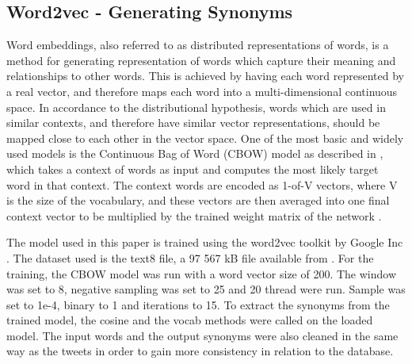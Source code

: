





\subsection{Word2vec - Generating Synonyms}
Word embeddings, also referred to as distributed representations of words, is a method for generating representation of words which capture their meaning and relationships to other words. This is achieved by having each word represented by a real vector, and therefore maps each word into a multi-dimensional continuous space. In accordance to the distributional hypothesis, words which are used in similar contexts, and therefore have similar vector representations, should be mapped close to each other in the vector space. One of the most basic and widely used models is the Continuous Bag of Word (CBOW) model as described in \cite{wordRep}, which takes a context of words as input and computes the most likely target word in that context. The context words are encoded as 1-of-V vectors, where V is the size of the vocabulary, and these vectors are then averaged into one final context vector to be multiplied by the trained weight matrix of the network \cite{wordRep}.


The model used in this paper is trained using the word2vec toolkit by Google Inc \cite{word2vec}. The dataset used is the text8 file, a 97 567 kB file available from \cite{dataset}. For the training, the CBOW model was run with a word vector size of 200. The window was set to 8, negative sampling was set to 25 and 20 thread were run. Sample was set to 1e-4, binary to 1 and iterations to 15. To extract the synonyms from the trained model, the cosine and the vocab methods were called on the loaded model. The input words and the output synonyms were also cleaned in the same way as the tweets in order to gain more consistency in relation to the database.
